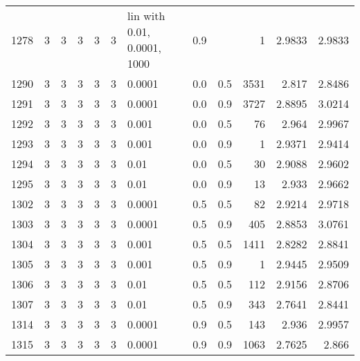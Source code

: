 \begin{longtable}{lrrrrrlrrrrr}
 1278 &       3 & 3 & 3 & 3 & 3 & lin with 0.01, 0.0001, 1000 &      0.9 &        &       1 &                 2.9833 &                 2.9833 \\
 1290 &       3 & 3 & 3 & 3 & 3 &                      0.0001 &      0.0 &    0.5 &    3531 &                  2.817 &                 2.8486 \\
 1291 &       3 & 3 & 3 & 3 & 3 &                      0.0001 &      0.0 &    0.9 &    3727 &                 2.8895 &                 3.0214 \\
 1292 &       3 & 3 & 3 & 3 & 3 &                       0.001 &      0.0 &    0.5 &      76 &                  2.964 &                 2.9967 \\
 1293 &       3 & 3 & 3 & 3 & 3 &                       0.001 &      0.0 &    0.9 &       1 &                 2.9371 &                 2.9414 \\
 1294 &       3 & 3 & 3 & 3 & 3 &                        0.01 &      0.0 &    0.5 &      30 &                 2.9088 &                 2.9602 \\
 1295 &       3 & 3 & 3 & 3 & 3 &                        0.01 &      0.0 &    0.9 &      13 &                  2.933 &                 2.9662 \\
 1302 &       3 & 3 & 3 & 3 & 3 &                      0.0001 &      0.5 &    0.5 &      82 &                 2.9214 &                 2.9718 \\
 1303 &       3 & 3 & 3 & 3 & 3 &                      0.0001 &      0.5 &    0.9 &     405 &                 2.8853 &                 3.0761 \\
 1304 &       3 & 3 & 3 & 3 & 3 &                       0.001 &      0.5 &    0.5 &    1411 &                 2.8282 &                 2.8841 \\
 1305 &       3 & 3 & 3 & 3 & 3 &                       0.001 &      0.5 &    0.9 &       1 &                 2.9445 &                 2.9509 \\
 1306 &       3 & 3 & 3 & 3 & 3 &                        0.01 &      0.5 &    0.5 &     112 &                 2.9156 &                 2.8706 \\
 1307 &       3 & 3 & 3 & 3 & 3 &                        0.01 &      0.5 &    0.9 &     343 &                 2.7641 &                 2.8441 \\
 1314 &       3 & 3 & 3 & 3 & 3 &                      0.0001 &      0.9 &    0.5 &     143 &                  2.936 &                 2.9957 \\
 1315 &       3 & 3 & 3 & 3 & 3 &                      0.0001 &      0.9 &    0.9 &    1063 &                 2.7625 &                  2.866 \\

\end{longtable}
